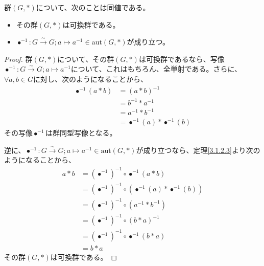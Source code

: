 \documentclass[dvipdfmx]{jsarticle}
\begin{document}
\begin{thm}\label{3.1.3.4}
群$(G,*)$について、次のことは同値である。
\begin{itemize}
\item
  その群$(G,*)$は可換群である。
\item
  $\bullet^{- 1}:G\overset{\sim}{\rightarrow}G;a \mapsto a^{- 1} \in \mathrm{aut}(G,*)$が成り立つ。
\end{itemize}
\end{thm}
\begin{proof}
群$(G,*)$について、その群$(G,*)$は可換群であるなら、写像$\bullet^{- 1}:G\overset{\sim}{\rightarrow}G;a \mapsto a^{- 1}$について、これはもちろん、全単射である。さらに、$\forall a,b \in G$に対し、次のようになることから、
\begin{align*}
\bullet^{- 1}(a*b) &= (a*b)^{- 1}\\
&= b^{- 1}*a^{- 1}\\
&= a^{- 1}*b^{- 1}\\
&= \bullet^{- 1}(a)* \bullet^{- 1}(b)
\end{align*}
その写像$\bullet^{- 1}$は群同型写像となる。\par
逆に、$\bullet^{- 1}:G\overset{\sim}{\rightarrow}G;a \mapsto a^{- 1} \in \mathrm{aut}(G,*)$が成り立つなら、定理\ref{3.1.2.3}より次のようになることから、
\begin{align*}
a*b &= \left( \bullet^{- 1} \right)^{- 1} \circ \bullet^{- 1}(a*b)\\
&= \left( \bullet^{- 1} \right)^{- 1} \circ \left( \bullet^{- 1}(a)* \bullet^{- 1}(b) \right)\\
&= \left( \bullet^{- 1} \right)^{- 1} \circ \left( a^{- 1}*b^{- 1} \right)\\
&= \left( \bullet^{- 1} \right)^{- 1} \circ (b*a)^{- 1}\\
&= \left( \bullet^{- 1} \right)^{- 1} \circ \bullet^{- 1}(b*a)\\
&= b*a
\end{align*}
その群$(G,*)$は可換群である。
\end{proof}
\end{document}
